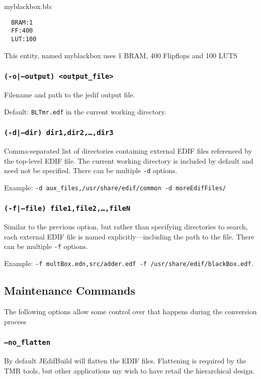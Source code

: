 myblackbox.bb:\\
\begin{verbatim}
  BRAM:1
  FF:400
  LUT:100
\end{verbatim}

This entity, named myblackbox uses 1 BRAM, 400 Flipflops and 100 LUTS

\subsubsection{\texttt{(-o|--output) <output\_file>}}
Filename and path to the jedif output file.

Default: \texttt{BLTmr.edf} in the current working directory.

\subsubsection{\texttt{(-d|--dir) dir1,dir2,\ldots,dir3}}
Comma-separated list of directories containing external EDIF files referenced 
by the top-level EDIF file. The current working directory is included by 
default and need not be specified. There can be multiple \texttt{-d} options.

Example: \texttt{-d aux\_files,/usr/share/edif/common -d
  moreEdifFiles/}

\subsubsection{\texttt{(-f|--file) file1,file2,\ldots,fileN}}
Similar to the previous option, but rather than specifying directories to 
search, each external EDIF file is named explicitly---including the path to the 
file. There can be multiple \texttt{-f} options. 

Example: \texttt{-f multBox.edn,src/adder.edf -f /usr/share/edif/blackBox.edf}.

\subsection{Maintenance Commands}
The following options allow some control over that happens during the 
conversion process

\subsubsection{\texttt{--no\_flatten}}
By default JEdifBuild will flatten the EDIF files. Flattening is required by the 
TMR tools, but other applications my wish to have retail the hierarchical design.

